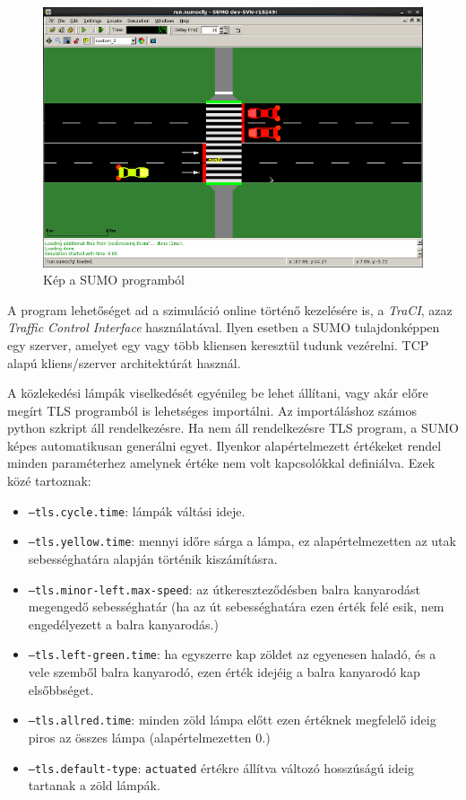 \begin{figure}[H]
\includegraphics[width=\linewidth]{SUMO.png}
\caption{Kép a SUMO programból \cite{sumopic}}
\label{fig:SUMO}
\end{figure}

A program lehetőséget ad a szimuláció online történő kezelésére is, a \textit{TraCI}, azaz \textit{Traffic Control Interface} használatával. Ilyen esetben a SUMO tulajdonképpen egy szerver, amelyet
egy vagy több kliensen keresztül tudunk vezérelni. TCP alapú kliens/szerver architektúrát használ. 

A közlekedési lámpák viselkedését egyénileg be lehet állítani, vagy akár előre
megírt TLS programból is lehetséges importálni. Az importáláshoz számos python szkript áll rendelkezésre. Ha nem áll rendelkezésre TLS program, a SUMO képes automatikusan generálni
egyet. Ilyenkor alapértelmezett értékeket rendel minden paraméterhez amelynek értéke nem volt kapcsolókkal definiálva. Ezek közé tartoznak:
\begin{itemize}
\item \texttt{--tls.cycle.time}: lámpák váltási ideje.
\item \texttt{--tls.yellow.time}: mennyi időre sárga a lámpa, ez alapértelmezetten az utak sebességhatára alapján történik kiszámításra.
\item \texttt{--tls.minor-left.max-speed}: az útkereszteződésben balra kanyarodást megengedő sebességhatár (ha az út sebességhatára ezen érték felé esik, nem engedélyezett a balra kanyarodás.)
\item \texttt{--tls.left-green.time}: ha egyszerre kap zöldet az egyenesen haladó, és a vele szemből balra kanyarodó, ezen érték idejéig a balra kanyarodó kap elsőbbséget.
\item \texttt{--tls.allred.time}: minden zöld lámpa előtt ezen értéknek megfelelő ideig piros az összes lámpa (alapértelmezetten 0.)
\item \texttt{--tls.default-type}: \texttt{actuated} értékre állítva változó hosszúságú ideig tartanak a zöld lámpák.
\end{itemize}

